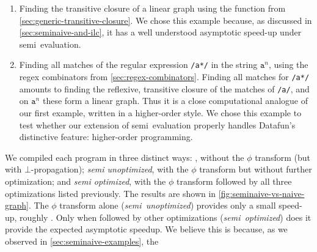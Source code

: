 \begin{enumerate}
\item Finding the transitive closure of a linear graph using the 
  function from \cref{sec:generic-transitive-closure}. We chose this example
  because, as discussed in \cref{sec:seminaive-and-ilc}, it has a well
  understood asymptotic speed-up under semi\naive\ evaluation. 

\item Finding all matches of the regular expression \texttt{/a*/} in the string
  $\texttt{a}^n$, using the regex combinators from \cref{sec:regex-combinators}.
  Finding all matches for \texttt{/a*/} amounts to finding the reflexive,
  transitive closure of the matches of \texttt{/a/}, and on $\texttt{a}^n$ these
  form a linear graph. Thus it is a close computational analogue of our first
  example, written in a higher-order style. We chose this example to test
  whether our extension of semi\naive\ evaluation properly handles Datafun's
  distinctive feature: higher-order programming.
\end{enumerate}

We compiled each program in three distinct ways: \emph{\naive{}}, without the
$\phi$ transform (but with $\bot$-propagation); \emph{semi\naive{} unoptimized},
with the $\phi$ transform but without further optimization; and
\emph{semi\naive{} optimized}, with the $\phi$ transform followed by all three
optimizations listed previously. The results are shown in
\cref{fig:seminaive-vs-naive-graph}. The $\phi$ transform alone
(\emph{semi\naive\ unoptimized}) provides only a small speed-up, roughly
. Only when followed by other optimizations
(\emph{semi\naive\ optimized}) does it provide the expected asymptotic speedup.
We believe this is because, as we observed in \cref{sec:seminaive-examples}, the




